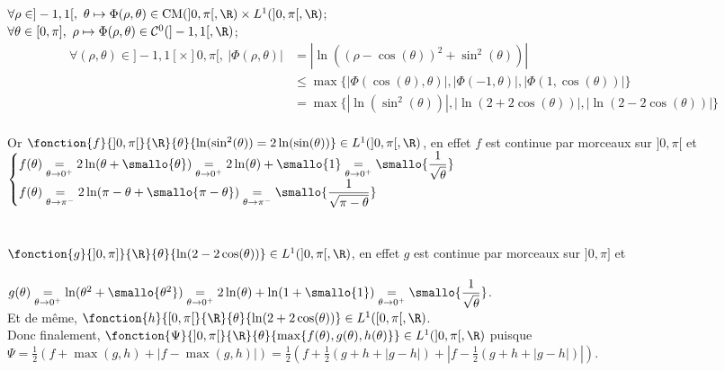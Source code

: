 \documentclass{book}
\begin{document}
\begin{enumerate}[leftmargin=*\\]
		$\forall \rho\in ]-1,1[,\ \theta\mapsto \Phi(\rho,\theta)\in \text{CM}(]0,\pi[,\R)\times L^1(]0,\pi[,\R)$;\\
		$\forall \theta\in [0,\pi],\ \rho\mapsto \Phi(\rho,\theta)\in \mathcal{C}^0(]-1,1[,\R)$;
		\begin{align*}
			\forall (\rho,\theta)\in ]-1,1[\times]0,\pi[,\ \left|\Phi(\rho,\theta)\right|&=\left|\ln((\rho-\cos(\theta))^2+\sin^2(\theta))\right|\\
			&\leq\max\{\left|\Phi(\cos(\theta),\theta)\right|,\left|\Phi(-1,\theta)\right|,\left|\Phi(1,\cos(\theta))\right|\}\\
			&=\max\{\left|\ln(\sin^2(\theta))\right|,\left|\ln(2+2\cos(\theta))\right|,\left|\ln(2-2\cos(\theta))\right|\}
		\end{align*}\\
		Or $\fonction{f}{]0,\pi[}{\R}{\theta}{\ln(\sin^2(\theta))=2\ln(\sin(\theta))}\in L^1(]0,\pi[,\R)$, en effet $f$ est continue par morceaux sur $]0,\pi[$ et\\
		$\begin{cases}
			f(\theta)\underset{\theta\to 0^+}{=}2\ln(\theta+\smallo{\theta})\underset{\theta\to 0^+}{=}2\ln(\theta)+\smallo{1}\underset{\theta\to 0^+}{=}\smallo{\displaystyle\frac{1}{\displaystyle\sqrt{\theta}}}\\
			f(\theta)\underset{\theta\to \pi^-}{=}2\ln(\pi-\theta+\smallo{\pi-\theta})\underset{\theta\to \pi^-}{=}\smallo{\displaystyle\frac{1}{\displaystyle\sqrt{\pi-\theta}}}
		\end{cases}$\\\\\\
		$\fonction{g}{]0,\pi]}{\R}{\theta}{\ln(2-2\cos(\theta))}\in L^1(]0,\pi[,\R)$, en effet $g$ est continue par morceaux sur $]0,\pi]$ et\\\\
		$g(\theta)\underset{\theta\to 0^+}{=}\ln(\theta^2+\smallo{\theta^2})\underset{\theta\to 0^+}{=}2\ln(\theta)+\ln(1+\smallo{1})\underset{\theta\to 0^+}{=}\smallo{\displaystyle\frac{1}{\displaystyle\sqrt{\theta}}}$.\\
		Et de même, $\fonction{h}{[0,\pi[}{\R}{\theta}{\ln(2+2\cos(\theta))}\in L^1([0,\pi[,\R)$.\\
		Donc finalement, $\fonction{\Psi}{]0,\pi[}{\R}{\theta}{\max\{f(\theta),g(\theta),h(\theta)\}}\in L^1(]0,\pi[,\R)$ puisque\\
		$\Psi=\displaystyle\frac{1}{2}(f+\max(g,h)+|f-\max(g,h)|)=\frac{1}{2}\left(f+\frac{1}{2}\left(g+h+|g-h|\right)+\left|f-\frac{1}{2}(g+h+|g-h|)\right|\right)$.\\

\end{enumerate}
\end{document}
